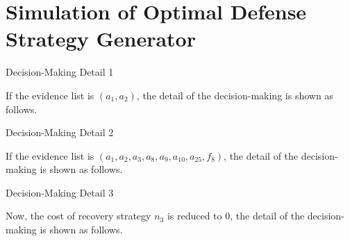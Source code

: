 
\section{Simulation of Optimal Defense Strategy Generator}

\begin{frame}{Decision-Making Detail 1}
  \begin{overlayarea}{\textwidth}{7cm}
  If the evidence list is $(a_1, a_2)$, the detail of the decision-making is shown as follows.\vspace{5pt}
  \begin{center}
    \scalebox{1}{
    
    }
  \end{center}
  \end{overlayarea}
\end{frame}

\begin{frame}{Decision-Making Detail 2}
  \begin{overlayarea}{\textwidth}{7cm}
  If the evidence list is $(a_1, a_2, a_3, a_8, a_9, a_{10}, a_{25}, f_8)$, the detail of the decision-making is shown as follows.
  \begin{center}
    \scalebox{0.7}{
    
    }
  \end{center}
  \end{overlayarea}
\end{frame}

\begin{frame}{Decision-Making Detail 3}
  \begin{overlayarea}{\textwidth}{7cm}
  Now, the cost of recovery strategy $n_3$ is reduced to $0$, the detail of the decision-making is shown as follows.
  \begin{center}
    \scalebox{0.7}{
    
    }
  \end{center}
  \end{overlayarea}
\end{frame}